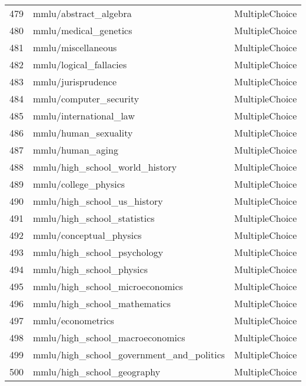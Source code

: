 \documentclass[11pt]{article}
\begin{document}
\begin{longtable}{lll}
479 & mmlu/abstract\_algebra \citep{hendryckstest2021} & MultipleChoice \\
480 & mmlu/medical\_genetics \citep{hendryckstest2021} & MultipleChoice \\
481 & mmlu/miscellaneous \citep{hendryckstest2021} & MultipleChoice \\
482 & mmlu/logical\_fallacies \citep{hendryckstest2021} & MultipleChoice \\
483 & mmlu/jurisprudence \citep{hendryckstest2021} & MultipleChoice \\
484 & mmlu/computer\_security \citep{hendryckstest2021} & MultipleChoice \\
485 & mmlu/international\_law \citep{hendryckstest2021} & MultipleChoice \\
486 & mmlu/human\_sexuality \citep{hendryckstest2021} & MultipleChoice \\
487 & mmlu/human\_aging \citep{hendryckstest2021} & MultipleChoice \\
488 & mmlu/high\_school\_world\_history \citep{hendryckstest2021} & MultipleChoice \\
489 & mmlu/college\_physics \citep{hendryckstest2021} & MultipleChoice \\
490 & mmlu/high\_school\_us\_history \citep{hendryckstest2021} & MultipleChoice \\
491 & mmlu/high\_school\_statistics \citep{hendryckstest2021} & MultipleChoice \\
492 & mmlu/conceptual\_physics \citep{hendryckstest2021} & MultipleChoice \\
493 & mmlu/high\_school\_psychology \citep{hendryckstest2021} & MultipleChoice \\
494 & mmlu/high\_school\_physics \citep{hendryckstest2021} & MultipleChoice \\
495 & mmlu/high\_school\_microeconomics \citep{hendryckstest2021} & MultipleChoice \\
496 & mmlu/high\_school\_mathematics \citep{hendryckstest2021} & MultipleChoice \\
497 & mmlu/econometrics \citep{hendryckstest2021} & MultipleChoice \\
498 & mmlu/high\_school\_macroeconomics \citep{hendryckstest2021} & MultipleChoice \\
499 & mmlu/high\_school\_government\_and\_politics \citep{hendryckstest2021} & MultipleChoice \\
500 & mmlu/high\_school\_geography \citep{hendryckstest2021} & MultipleChoice \\

\end{longtable}
\end{document}
